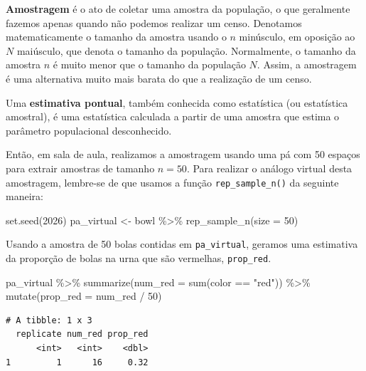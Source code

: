 \documentclass[
  letterpaper,
  DIV=11,
  numbers=noendperiod]{scrreprt}
\newenvironment{Shaded}{\begin{snugshade}}{\end{snugshade}}
\newcommand{\AttributeTok}[1]{\textcolor[rgb]{0.40,0.45,0.13}{#1}}
\newcommand{\DecValTok}[1]{\textcolor[rgb]{0.68,0.00,0.00}{#1}}
\newcommand{\FunctionTok}[1]{\textcolor[rgb]{0.28,0.35,0.67}{#1}}
\newcommand{\NormalTok}[1]{\textcolor[rgb]{0.00,0.23,0.31}{#1}}
\newcommand{\OtherTok}[1]{\textcolor[rgb]{0.00,0.23,0.31}{#1}}
\newcommand{\SpecialCharTok}[1]{\textcolor[rgb]{0.37,0.37,0.37}{#1}}
\newcommand{\StringTok}[1]{\textcolor[rgb]{0.13,0.47,0.30}{#1}}
\begin{document}
\textbf{Amostragem} é o ato de coletar uma amostra da população, o que
geralmente fazemos apenas quando não podemos realizar um censo.
Denotamos matematicamente o tamanho da amostra usando o \(n\) minúsculo,
em oposição ao \(N\) maiúsculo, que denota o tamanho da população.
Normalmente, o tamanho da amostra \(n\) é muito menor que o tamanho da
população \(N\). Assim, a amostragem é uma alternativa muito mais barata
do que a realização de um censo.

Uma \textbf{estimativa pontual}, também conhecida como estatística (ou
estatística amostral), é uma estatística calculada a partir de uma
amostra que estima o parâmetro populacional desconhecido.

Então, em sala de aula, realizamos a amostragem usando uma pá com 50
espaços para extrair amostras de tamanho \(n = 50\). Para realizar o
análogo virtual desta amostragem, lembre-se de que usamos a função
\texttt{rep\_sample\_n()} da seguinte maneira:

\begin{Shaded}
\begin{Highlighting}[]
\FunctionTok{set.seed}\NormalTok{(}\DecValTok{2026}\NormalTok{)}
\NormalTok{pa\_virtual }\OtherTok{\textless{}{-}}\NormalTok{ bowl }\SpecialCharTok{\%\textgreater{}\%}   
  \FunctionTok{rep\_sample\_n}\NormalTok{(}\AttributeTok{size =} \DecValTok{50}\NormalTok{)}
\end{Highlighting}
\end{Shaded}

Usando a amostra de 50 bolas contidas em \texttt{pa\_virtual}, geramos
uma estimativa da proporção de bolas na urna que são vermelhas,
\texttt{prop\_red}.

\begin{Shaded}
\begin{Highlighting}[]
\NormalTok{pa\_virtual }\SpecialCharTok{\%\textgreater{}\%}   
  \FunctionTok{summarize}\NormalTok{(}\AttributeTok{num\_red =} \FunctionTok{sum}\NormalTok{(color }\SpecialCharTok{==} \StringTok{"red"}\NormalTok{)) }\SpecialCharTok{\%\textgreater{}\%}   
  \FunctionTok{mutate}\NormalTok{(}\AttributeTok{prop\_red =}\NormalTok{ num\_red }\SpecialCharTok{/} \DecValTok{50}\NormalTok{)}
\end{Highlighting}
\end{Shaded}

\begin{verbatim}
# A tibble: 1 x 3
  replicate num_red prop_red
      <int>   <int>    <dbl>
1         1      16     0.32
\end{verbatim}
\end{document}
